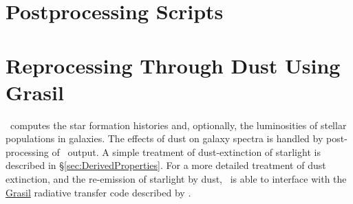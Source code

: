 \section{Postprocessing Scripts}\label{sec:PostProcessingScripts}

\section{Reprocessing Through Dust Using {\sc Grasil}}\label{sec:Grasil}

\glc\ computes the star formation histories and, optionally, the luminosities of stellar populations in galaxies. The effects of dust on galaxy spectra is handled by post-processing of \glc\ output. A simple treatment of dust-extinction of starlight is described in \S\ref{sec:DerivedProperties}. For a more detailed treatment of dust extinction, and the re-emission of starlight by dust, \glc\ is able to interface with the \href{http://adlibitum.oat.ts.astro.it/silva/grasil/grasil.html}{{\sc Grasil}} radiative transfer code described by \cite{silva_modeling_1998}.

